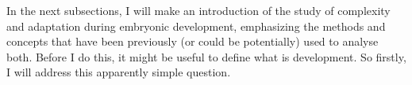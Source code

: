 %
In the next subsections, I will make an introduction of the study of complexity and adaptation during embryonic development, emphasizing the methods and concepts that have been previously (or could be potentially) used to analyse both. 
%
Before I do this, it might be useful to define what is development. So firstly, I will address this apparently simple question.
